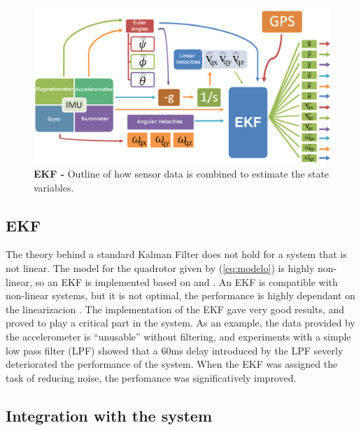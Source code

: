 \documentclass[conference]{IEEEtran}
\newcommand{\refp}[1]{(\ref{#1})}
\begin{document}
\begin{figure}
	\centering
	\includegraphics[width=1\columnwidth]{./pics_paper/diagrama_kalman_eng.png}
	\caption{\textbf{EKF - } Outline of how sensor data is combined to estimate the state variables.}
	\label{fig:diagrama_kalman}
\end{figure}

\subsection{EKF}
\label{sec:kalman-ekf}

The theory behind a standard Kalman Filter does not hold for a system that is not linear. The model for the quadrotor given by \refp{eq:modelo} is highly non-linear, so an EKF is implemented based on \cite{bib:kalman} and \cite{bib:kalman2}. An EKF is compatible with non-linear systems, but it is not optimal, the performance is highly dependant on the linearizacion \cite{bib:kay}. The implementation of the EKF gave very good results, and proved to play a critical part in the system. As an example, the data provided by the accelerometer is ``unusable'' without filtering, and experiments with a simple low pass filter (LPF) showed that a 60ms delay introduced by the LPF severly deteriorated the performance of the system. When the EKF was assigned the task of reducing noise, the perfomance was significatively improved.

\subsection{Integration with the system}
\label{sec:kalman-integration}

\end{document}
